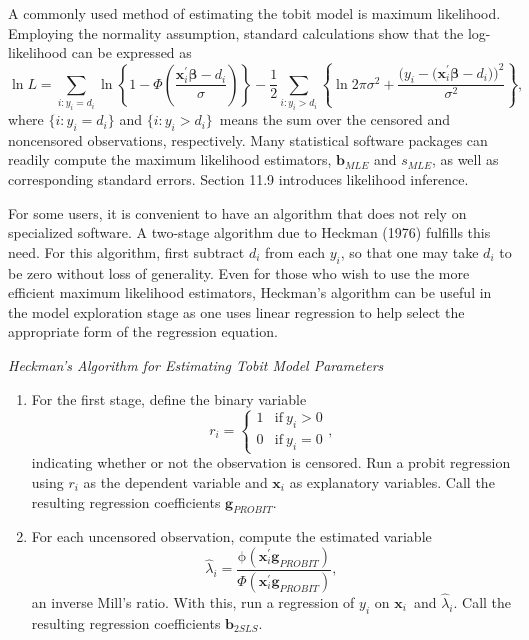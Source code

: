 A commonly used method of estimating the tobit model is maximum
likelihood. Employing the normality assumption, standard
calculations show that the log-likelihood can be expressed as
\begin{equation}\label{E16:Eq4}
\ln L = \sum\limits_{i:y_i=d_i} \ln \left\{ 1-\Phi \left(
\frac{\mathbf{x} _i^{\prime}\boldsymbol \beta -d_i}{\sigma }\right)
\right\} -\frac{1}{2} \sum\limits_{i:y_i>d_i} \left\{ \ln 2\pi
\sigma ^2 + \frac{(y_i-( \mathbf{x}_i^{\prime}\boldsymbol
\beta-d_i\mathbf{))}^2 }{\sigma^2}\right\} ,
\end{equation}
where $\{i:y_i=d_i\}$ and $\{i:y_i>d_i\}$\ means the sum over the
censored and noncensored observations, respectively. Many
statistical software packages can readily compute the maximum
likelihood estimators, $\mathbf{b}_{MLE}$ and $s_{MLE}$, as well as
corresponding standard errors. Section 11.9 introduces likelihood
inference. 

For some users, it is convenient to have an algorithm that does not
rely on specialized software. A two-stage algorithm due to Heckman
(1976) fulfills this need. For this algorithm, first subtract $d_i$
from each $y_i$, so that one may take $d_i$ to be zero without loss
of generality. Even for those who wish to use the more efficient
maximum likelihood estimators, Heckman's algorithm can be useful in
the model exploration stage as one uses linear regression to help
select the appropriate form of the regression equation.

\bigskip

\boxedjed

\textit{Heckman's Algorithm for Estimating Tobit Model Parameters}

\begin{enumerate}
\item For the first stage, define the binary variable
\begin{equation*}
r_i=\left\{
\begin{array}{ll}
1 & \mathrm{if}~y_i>0 \\
0 & \mathrm{if}~y_i=0
\end{array}
\right. ,
\end{equation*}
indicating whether or not the observation is censored. Run a probit
regression using $r_i$ as the dependent variable and $\mathbf{x}_i$
as explanatory variables. Call the resulting regression coefficients
$\mathbf{g}_{PROBIT}.$

\item For each uncensored observation, compute the estimated variable
\begin{equation*}
\widehat{\lambda}_i=\frac{\mathrm{\phi }\left( \mathbf{x}_i^{\prime}
\mathbf{g}_{PROBIT}\right) }{\Phi \left( \mathbf{x}_i^{\prime}
\mathbf{g}_{PROBIT}\right) },
\end{equation*}
an inverse Mill's ratio. With this, run a regression of $y_i$ on
$\mathbf{x}_i$\ and $\widehat{\lambda}_i$. Call the resulting
regression coefficients $\mathbf{b}_{2SLS}.$
\end{enumerate}

